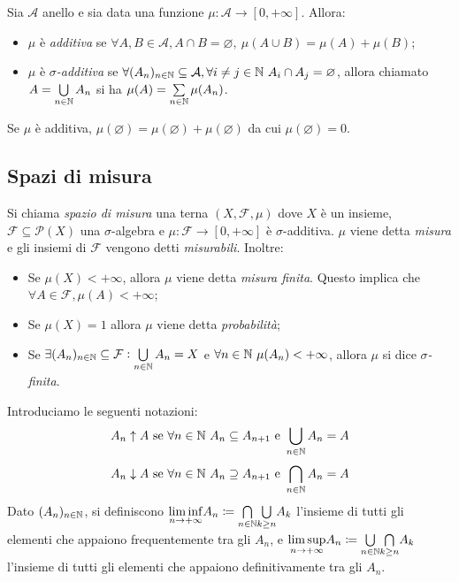 \begin{definition}
	Sia $\mathcal{A}$ anello e sia data una funzione $\mu:\mathcal{A} \rightarrow[0,+\infty]$. Allora:
	\begin{itemize}
		\item $\mu$ è \emph{additiva} se $\forall A,B \in \mathcal{A}, A\cap B=\varnothing,\ \mu( A\cup B)=\mu(A)+\mu(B)$;
		\item $\mu$ è \emph{$\sigma$-additiva} se $\forall (A_n)_{n\in\mathbb{N}}\subseteq \mathcal{A}, \forall i\neq j \in \mathbb{N} \ A_i\cap A_j =\varnothing$, allora chiamato $ A=\bigcup\limits_{n\in\mathbb{N}}A_n$ si ha $\mu(A)=\sum\limits_{n\in\mathbb{N}} \mu(A_n)$.
	\end{itemize}
\end{definition}

\begin{oss}
	Se $\mu$ è additiva, $\mu(\varnothing)=\mu(\varnothing)+\mu(\varnothing)$ da cui $\mu(\varnothing)=0$.
\end{oss}

\subsection{Spazi di misura}
\begin{definition}
	Si chiama \emph{spazio di misura} una terna $(X,\mathcal{F}, \mu)$ dove $X$ è un insieme, ${\mathcal{F}\subseteq \mathscr{P}(X)}$ una $\sigma$-algebra e $\mu\colon\mathcal{F} \to [0,+\infty]$ è $\sigma$-additiva. $\mu$ viene detta \emph{misura} e gli insiemi di $\mathcal{F}$ vengono detti \emph{misurabili}.
	Inoltre:
	\begin{itemize}
		\item Se $\mu(X)<+\infty$, allora $\mu$ viene detta \emph{misura finita}. Questo implica che $\forall A \in \mathcal{F}, {\mu(A) < +\infty} $;
		\item Se $\mu(X)=1$ allora $\mu$ viene detta \emph{probabilità};
		\item Se $\exists (A_n)_{n\in\mathbb{N}}\subseteq\mathcal{F} : \bigcup\limits_{n\in\mathbb{N}}A_n=X$ e $\forall n \in\mathbb{N} \ \mu(A_n) <+\infty$, allora $\mu$ si dice \emph{$\sigma$-finita}.
	\end{itemize}
\end{definition}
Introduciamo le seguenti notazioni:
\[ A_n \uparrow   A \text{ se } \forall n \in\mathbb{N} \ A_n \subseteq A_{n+1} \text{ e } \bigcup\limits_{n\in \mathbb{N}}A_n = A \]
\[ A_n \downarrow A \text{ se } \forall n \in\N \ A_n \supseteq A_{n+1} \text{ e } \bigcap\limits_{n\in \N}A_n = A \]
Dato $(A_n)_{n\in\mathbb{N}}$, si definiscono $\underset{n\to+\infty}{\liminf}A_n \coloneqq\underset{n\in\mathbb{N}}{\bigcap}\underset{k\geq n}{\bigcup}A_k$ l'insieme di tutti gli elementi che appaiono frequentemente tra gli $A_n$, e $\underset{n\to +\infty}{\limsup}A_n\coloneqq\underset{n\in\mathbb{N}}{\bigcup}\underset{k\geq n}{\bigcap}A_k$ l'insieme di tutti gli elementi che appaiono definitivamente tra gli $A_n$.


